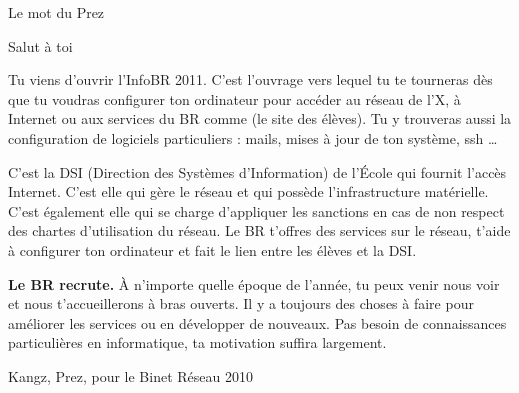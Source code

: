 

\begin{center}
    { \Huge Le mot du Prez }
\end{center}

Salut \`a toi

Tu viens d'ouvrir l'InfoBR 2011. C'est l'ouvrage vers lequel tu te tourneras d\`es que tu voudras configurer ton ordinateur pour acc\'eder au r\'eseau de l'X, \`a Internet ou aux services du BR comme \fkz (le site des \'el\`eves). Tu y trouveras aussi la configuration de logiciels particuliers : mails, mises \`a jour de ton syst\`eme, ssh \dots
{}

C'est la DSI (Direction des Syst\`emes d'Information) de l'\'Ecole qui fournit l'acc\`es Internet. C'est elle qui g\`ere le r\'eseau et qui poss\`ede l'infrastructure mat\'erielle. C'est \'egalement elle qui se charge d'appliquer les sanctions en cas de non respect des chartes d'utilisation du r\'eseau. Le BR t'offres des services sur le r\'eseau, t'aide \`a configurer ton ordinateur et fait le lien entre les \'el\`eves et la DSI.

\textbf{Le BR recrute.} \`A n'importe quelle \'epoque de l'ann\'ee, tu peux venir nous voir et nous t'accueillerons \`a bras ouverts. Il y a toujours des choses \`a faire pour am\'eliorer les services ou en d\'evelopper de nouveaux. Pas besoin de connaissances particuli\`eres en informatique, ta motivation suffira largement.

\begin{flushright}
    Kangz, Prez, pour le Binet R\'eseau 2010
\end{flushright}


